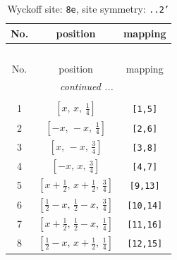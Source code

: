 \documentclass[fleqn,8pt]{jsarticle}
\begin{document}
\renewcommand{\arraystretch}{1.2}
\begin{longtable}{ccc}
\caption{Wyckoff site: {\tt 8e}, site symmetry: {\tt ..2'}}
 \\
 \hline \hline
No. & position & mapping \\ \hline \endfirsthead

\multicolumn{2}{l}{\tablename\ \thetable{}} \\
 \hline \hline
No. & position & mapping \\ \hline \endhead

 \hline \hline
\multicolumn{2}{r}{\footnotesize\it continued ...} \\ \endfoot

 \hline \hline
\multicolumn{2}{r}{} \\ \endlastfoot

1 & $\left[ x,\, x,\, \frac{1}{4} \right]$ & {\tt [1,5]} \\ \hline
2 & $\left[ - x,\, - x,\, \frac{1}{4} \right]$ & {\tt [2,6]} \\ \hline
3 & $\left[ x,\, - x,\, \frac{3}{4} \right]$ & {\tt [3,8]} \\ \hline
4 & $\left[ - x,\, x,\, \frac{3}{4} \right]$ & {\tt [4,7]} \\ \hline
5 & $\left[ x + \frac{1}{2},\, x + \frac{1}{2},\, \frac{3}{4} \right]$ & {\tt [9,13]} \\ \hline
6 & $\left[ \frac{1}{2} - x,\, \frac{1}{2} - x,\, \frac{3}{4} \right]$ & {\tt [10,14]} \\ \hline
7 & $\left[ x + \frac{1}{2},\, \frac{1}{2} - x,\, \frac{1}{4} \right]$ & {\tt [11,16]} \\ \hline
8 & $\left[ \frac{1}{2} - x,\, x + \frac{1}{2},\, \frac{1}{4} \right]$ & {\tt [12,15]} \\
\end{longtable}
\renewcommand{\arraystretch}{1.2}
\end{document}
